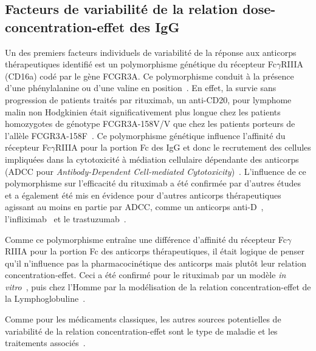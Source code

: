 \subsection{Facteurs de variabilité de la relation dose-concentration-effet des IgG}
Un des premiers facteurs individuels de variabilité de la réponse aux anticorps thérapeutiques identifié est un polymorphisme génétique du récepteur Fc$\gamma$RIIIA (CD16a) codé par le gène FCGR3A. Ce polymorphisme conduit à la présence d'une phénylalanine ou d'une valine en position~\citep{REF158}. En effet, la survie sans progression de patients traités par rituximab, un anti-CD20, pour lymphome malin non Hodgkinien était significativement plus longue chez les patients homozygotes de génotype FCGR3A-158V/V que chez les patients porteurs de l'allèle FCGR3A-158F~\citep{REF82}. Ce polymorphisme génétique influence l'affinité du récepteur Fc$\gamma$RIIIA pour la portion Fc des IgG et donc le recrutement des cellules impliquées dans la cytotoxicité à médiation cellulaire dépendante des anticorps (\gls{ADCC} pour \textit{Antibody-Dependent Cell-mediated Cytotoxicity})~\citep{REF83, REF84}. L'influence de ce polymorphisme sur l'efficacité du rituximab a été confirmée par d'autres études~\citep{REF85, REF86} et a également été mis en évidence pour d'autres anticorps thérapeutiques agissant au moins en partie par \gls{ADCC}, comme un anticorps anti-D~\citep{REF87}, l'infliximab~\citep{REF88} et le trastuzumab~\citep{REF89}.

Comme ce polymorphisme entraîne une différence d'affinité du récepteur Fc$\gamma$RIIIA pour la portion Fc des anticorps thérapeutiques, il était logique de penser qu'il n'influence pas la pharmacocinétique des anticorps mais plutôt leur relation concentration-effet. Ceci a été confirmé pour le rituximab par un modèle \textit{in vitro}~\citep{REF83}, puis chez l'Homme par la modélisation de la relation concentration-effet de la Lymphoglobuline~\citep{REF86}.

Comme pour les médicaments classiques, les autres sources potentielles de variabilité de la relation concentration-effet sont le type de maladie et les traitements associés~\citep{REF7}. 

